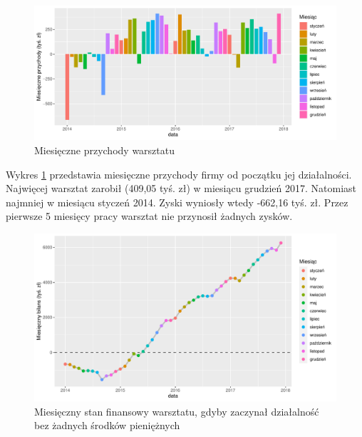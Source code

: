 \documentclass{article}\usepackage[]{graphicx}\usepackage[]{xcolor}
\makeatletter
\def\maxwidth{ %
  \ifdim\Gin@nat@width>\linewidth
    \linewidth
  \else
    \Gin@nat@width
  \fi
}
\newenvironment{knitrout}{}{} %
\makeatother
\begin{document}
\begin{knitrout}
\color{fgcolor}\begin{figure}[H]

{\centering \includegraphics[width=\maxwidth]{figure/fig_bilans-1} 

}

\caption[Miesięczne przychody warsztatu]{Miesięczne przychody warsztatu}\label{fig:fig_bilans}
\end{figure}

\end{knitrout}


Wykres \ref{fig:fig_bilans} przedstawia miesięczne przychody firmy od początku jej działalności. 
Najwięcej warsztat zarobił (409,05 tyś. zł) w miesiącu grudzień 2017.
Natomiast najmniej w miesiącu styczeń 2014. Zyski wyniosły wtedy -662,16 tyś. zł. Przez pierwsze 5 miesięcy pracy warsztat nie przynosił żadnych zysków.

\begin{knitrout}
\color{fgcolor}\begin{figure}[H]

{\centering \includegraphics[width=\maxwidth]{figure/fig_bilans_suma-1} 

}

\caption[Miesięczny stan finansowy warsztatu, gdyby zaczynał działalność bez żadnych środków pieniężnych]{Miesięczny stan finansowy warsztatu, gdyby zaczynał działalność bez żadnych środków pieniężnych}\label{fig:fig_bilans_suma}
\end{figure}

\end{knitrout}
\end{document}
